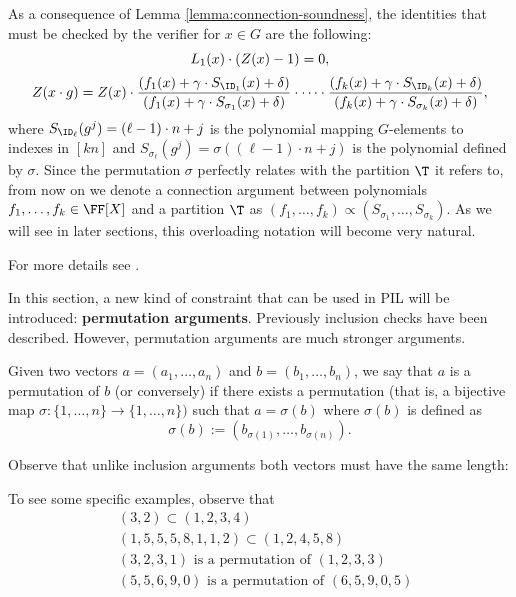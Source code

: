 As a consequence of Lemma \ref{lemma:connection-soundness}, the identities that must be checked by the verifier for $x \in G$ are the following: 
\begin{align*}
\begin{array}{c}
  L_1(x) \cdot (Z(x) - 1) = 0, \\[0.2cm]
  \displaystyle Z(x \cdot g)  = Z(x) \cdot \frac{(f_{1}(x) + \gamma \cdot S_{\ID_1}(x) + \delta)}{(f_{1}(x) + \gamma \cdot S_{\sigma_1}(x) + \delta)} \cdot \cdots \cdot \frac{(f_{k}(x) + \gamma \cdot S_{\ID_k}(x) + \delta)}{(f_{k}(x) + \gamma \cdot S_{\sigma_k}(x) + \delta)},
\end{array}
\end{align*}
where $S_{\ID_{\ell}}(g^j) = (\ell-1)\cdot n +j$ is the polynomial mapping $G$-elements to indexes in $[kn]$ and $S_{\sigma_{\ell}}(g^j) = \sigma((\ell-1)\cdot n +j)$ is the polynomial defined by $\sigma$. Since the permutation $\sigma$ perfectly relates with the partition $\T$ it refers to, from now on we denote a connection argument between polynomials $f_1,\dots,f_k \in \FF[X]$ and a partition $\T$ as $(f_1,\dots,f_k) \propto (S_{\sigma_1},\dots, S_{\sigma_k})$. As we will see in later sections, this overloading notation will become very natural.

For more details see \cite{EPRINT:GabWilCio19}.

In this section, a new kind of constraint that can be used in PIL will be introduced: \textbf{permutation arguments}. Previously inclusion checks have been described. However, permutation arguments are much stronger arguments. 

\begin{definition}
Given two vectors $a = (a_1, \dots, a_n)$ and $b = (b_1, \dots, b_n)$, we say that $a$ is a permutation of $b$ (or conversely) if there exists a permutation (that is, a bijective map $\sigma: \{1, \dots, n\} \to \{1, \dots, n\})$ such that $a = \sigma(b)$ where $\sigma(b)$ is defined as
\[
\sigma(b) := (b_{\sigma(1)}, \dots, b_{\sigma(n)}).
\]
\end{definition}

Observe that unlike inclusion arguments both vectors must have the same length: 

To see some specific examples, observe that
\begin{align*}
&(3, 2) \subset (1, 2, 3, 4) \\
&(1, 5, 5, 5, 8, 1, 1, 2) \subset (1, 2, 4, 5, 8) \\
&(3, 2, 3, 1) \text{ is a permutation of } (1, 2, 3, 3) \\
&(5, 5, 6, 9, 0) \text{ is a permutation of } (6, 5, 9, 0, 5)
\end{align*}

